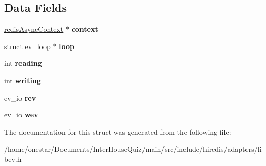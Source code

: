 \subsection*{Data Fields}
\begin{DoxyCompactItemize}
\item 
\hypertarget{structredis_libev_events_a5764ffeda6751a7e3eec0eb29d402bde}{\hyperlink{structredis_async_context}{redis\+Async\+Context} $\ast$ {\bfseries context}}\label{structredis_libev_events_a5764ffeda6751a7e3eec0eb29d402bde}

\item 
\hypertarget{structredis_libev_events_a855923b555731173d3509ecb645de0e0}{struct ev\+\_\+loop $\ast$ {\bfseries loop}}\label{structredis_libev_events_a855923b555731173d3509ecb645de0e0}

\item 
\hypertarget{structredis_libev_events_a5fa8d7fdcda2ed9555ad800a40a1a810}{int {\bfseries reading}}\label{structredis_libev_events_a5fa8d7fdcda2ed9555ad800a40a1a810}

\item 
\hypertarget{structredis_libev_events_adb2dbc8c43288a024535ed507da7b278}{int {\bfseries writing}}\label{structredis_libev_events_adb2dbc8c43288a024535ed507da7b278}

\item 
\hypertarget{structredis_libev_events_a9af2b5293cd85c1086ce25048c049bec}{ev\+\_\+io {\bfseries rev}}\label{structredis_libev_events_a9af2b5293cd85c1086ce25048c049bec}

\item 
\hypertarget{structredis_libev_events_a4ad936003aba0279f02c6c852456298e}{ev\+\_\+io {\bfseries wev}}\label{structredis_libev_events_a4ad936003aba0279f02c6c852456298e}

\end{DoxyCompactItemize}


The documentation for this struct was generated from the following file\+:\begin{DoxyCompactItemize}
\item 
/home/onestar/\+Documents/\+Inter\+House\+Quiz/main/src/include/hiredis/adapters/libev.\+h\end{DoxyCompactItemize}
